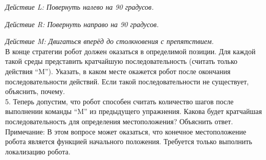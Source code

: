 \documentclass[10pt,a4paper]{article}
\begin{document}
\textit{Действие L: Повернуть налево на 90 градусов.}

\textit{Действие R: Повернуть направо на 90 градусов.}

\textit{Действие M: Двигаться вперёд до столкновения с препятствием.}\\

В конце стратегии робот должен оказаться в определимой позиции.
Для каждой такой среды представить кратчайшую последовательность (считать только действия “M”). Указать, в каком месте окажется робот после окончания последовательности действий. Если такой последовательности не существует, объяснить, почему.\\

5. Теперь допустим, что робот способен считать количество шагов после выполнении команды “M” из предыдущего упражнения. Какова будет кратчайшая последовательность для определения местоположения? Объяснить ответ.\\

Примечание: В этом вопросе может оказаться, что конечное местоположение робота является функцией начального положения. Требуется только выполнить локализацию робота.\\




 
\end{document}
